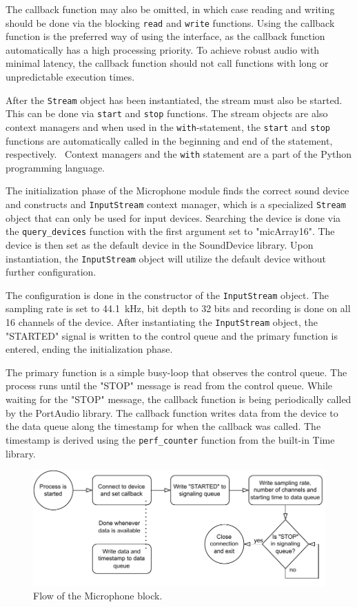The callback function may also be omitted,
in which case reading and writing should be done via the blocking \texttt{read} and \texttt{write} functions.
Using the callback function is the preferred way of using the interface,
as the callback function automatically has a high processing priority.
To achieve robust audio with minimal latency, 
the callback function should not call functions with long or unpredictable execution times.~\cite{sounddevice-docs-stream}

After the \texttt{Stream} object has been instantiated,
the stream must also be started.
This can be done via \texttt{start} and \texttt{stop} functions.
The stream objects are also context managers and when used in the \texttt{with}-statement,
the \texttt{start} and \texttt{stop} functions are automatically called in the beginning and end of the statement, respectively.~\cite{sounddevice-docs-stream}
Context managers and the \texttt{with} statement are a part of the Python programming language.

The initialization phase of the Microphone module finds the correct sound device and constructs and \texttt{InputStream} context manager,
which is a specialized \texttt{Stream} object that can only be used for input devices.
Searching the device is done via the \texttt{query\_devices} function with the first argument set to "micArray16".
The device is then set as the default device in the SoundDevice library.
Upon instantiation, the \texttt{InputStream} object will utilize the default device without further configuration.

The configuration is done in the constructor of the \texttt{InputStream} object.
The sampling rate is set to 44.1~kHz, bit depth to 32 bits and recording is done on all 16 channels of the device.
After instantiating the \texttt{InputStream} object, the "STARTED" signal is written to the control queue and the primary function is entered, ending the initialization phase.

The primary function is a simple busy-loop that observes the control queue.
The process runs until the "STOP" message is read from the control queue.
While waiting for the "STOP" message,
the callback function is being periodically called by the PortAudio library.
The callback function writes data from the device to the data queue along the timestamp for when the callback was called.
The timestamp is derived using the \texttt{perf\_counter} function from the built-in Time library.

\begin{figure}[H]
    \centering
    \includegraphics[width=\textwidth]{fig/3/mic-flowchart.pdf}
    \caption{Flow of the Microphone block.}
    \label{fig:mic-flowchart}
\end{figure}

